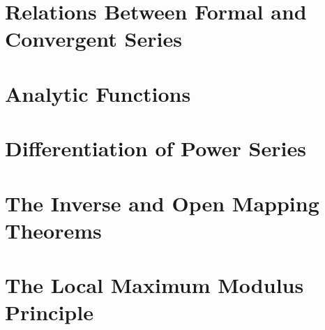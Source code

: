 \section{Relations Between Formal and Convergent Series}
\section{Analytic Functions}
\section{Differentiation of Power Series}
\section{The Inverse and Open Mapping Theorems}
\section{The Local Maximum Modulus Principle}